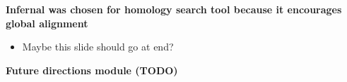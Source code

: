 \documentclass[landscape]{slides}
\begin{document}
\begin{slide}
\textbf{Infernal was chosen for homology search tool because it
  encourages global alignment}

\begin{itemize}
\item Maybe this slide should go at end? 
\end{itemize}

\vfill
\end{slide}
\begin{slide}
\textbf{Future directions module (TODO)}

\vfill
\end{slide}
\end{document}
